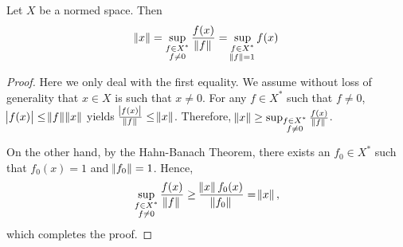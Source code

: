 \begin{prop}
Let $X$ be a normed space. 
Then 
\begin{equation*}
\norm{x} = \sup_{\substack{f \in X^\ast \\ f \neq 0}} 
\frac{f(x)}{\norm{f}} 
= \sup_{\substack{f \in X^\ast \\ \norm{f} = 1}} f(x)
\end{equation*}
\end{prop}
\begin{proof}
Here we only deal with the first equality. 
We assume without loss of generality that $x \in X$ is such that $x \neq 0$. 
For any $f \in X^\ast$ such that $f \neq 0$, $\abs{f(x)} \le \norm{f} 
\norm{x}$ yields $\frac{\abs{f(x)}}{\norm{f}} \le \norm{x}$. 
Therefore, $\norm{x} \ge \sup_{\substack{f \in X^\ast \\ f \neq 0}} 
\frac{f(x)}{\norm{f}}$. 

On the other hand, by the Hahn-Banach Theorem, there exists an 
$f_0 \in X^\ast$ such that $f_0(x) = 1$ and $\norm{f_0} = 1$. 
Hence, 
\begin{equation*}
    \sup_{\substack{f \in X^\ast \\ f \neq 0}} 
    \frac{f(x)}{\norm{f}} 
    \ge \frac{\norm{x} f_0(x)}{\norm{f_0}} = \norm{x}, 
\end{equation*}
which completes the proof. 
\end{proof}
